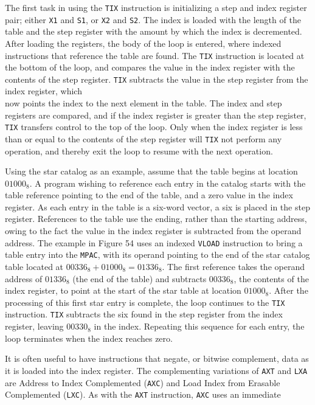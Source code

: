 \documentclass[refcap, oxford]{ahsan}
\begin{document}
The first task in using the \texttt{TIX} instruction is initializing a step and index register pair; either \texttt{X1} and \texttt{S1}, or \texttt{X2} and \texttt{S2}. The index is loaded with the length of the table and the step register with the amount by which the index is decremented. After loading the registers, the body of the loop is entered, where indexed instructions that reference the table are found. The \texttt{TIX} instruction is located at the bottom of the loop, and compares the value in the index register with the contents of the step register. \texttt{TIX} subtracts the value in the step register from the index register, which\\
now points the index to the next element in the table. The index and step registers are compared, and if the index register is greater than the step register, \texttt{TIX} transfers control to the top of the loop. Only when the index register is less than or equal to the contents of the step register will \texttt{TIX} not perform any operation, and thereby exit the loop to resume with the next operation.

Using the star catalog as an example, assume that the table begins at location $01000{ }_{8}$. A program wishing to reference each entry in the catalog starts with the table reference pointing to the end of the table, and a zero value in the index register. As each entry in the table is a six-word vector, a six is placed in the step register. References to the table use the ending, rather than the starting address, owing to the fact the value in the index register is subtracted from the operand address. The example in Figure 54 uses an indexed \texttt{VLOAD} instruction to bring a table entry into the \texttt{MPAC}, with its operand pointing to the end of the star catalog table located at $00336_{8}+01000_{8}=01336_{8}$. The first reference takes the operand address of $01336_{8}$ (the end of the table) and subtracts $00336_{8}$, the contents of the index register, to point at the start of the star table at location $01000_{8}$. After the processing of this first star entry is complete, the loop continues to the \texttt{TIX} instruction. \texttt{TIX} subtracts the six found in the step register from the index register, leaving $00330_{8}$ in the index. Repeating this sequence for each entry, the loop terminates when the index reaches zero.

It is often useful to have instructions that negate, or bitwise complement, data as it is loaded into the index register. The complementing variations of \texttt{AXT} and \texttt{LXA} are Address to Index Complemented (\texttt{AXC}) and Load Index from Erasable Complemented (\texttt{LXC}). As with the \texttt{AXT} instruction, \texttt{AXC} uses an immediate
\end{document}
